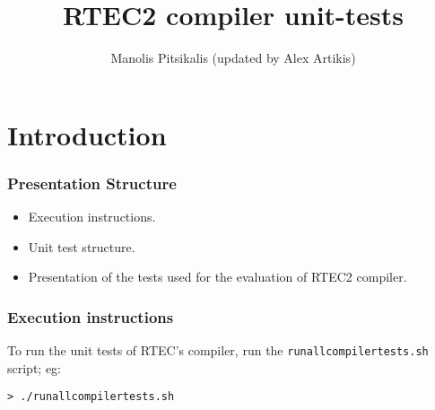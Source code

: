 \documentclass[8pt]{beamer}
\title[RTEC2 compiler unit-tests]{RTEC2 compiler unit-tests} %
\author{Manolis Pitsikalis (updated by Alex Artikis)} %
\newcounter{Table}
\begin{document}
\begin{frame}
\titlepage %
\end{frame}



\section{Introduction} %
\begin{frame}
  \frametitle{Presentation Structure}

\begin{itemize}
\item Execution instructions.
\item Unit test structure.
\item Presentation of the tests used for the evaluation of RTEC2 compiler.
\end{itemize}

\end{frame}


\begin{frame}
  \frametitle{Execution instructions}

To run the unit tests of RTEC's compiler, run the \texttt{runallcompilertests.sh} script; eg:

\bigskip

\texttt{> ./runallcompilertests.sh}

\end{frame}
\end{document}
